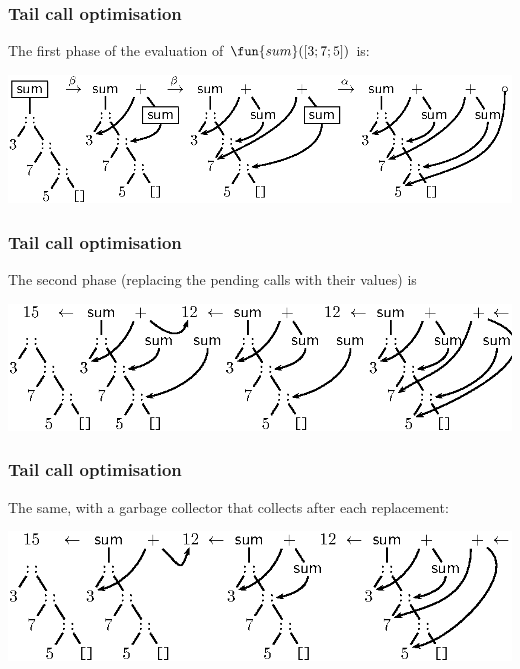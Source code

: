 \documentclass[compress,dvips,xcolor={dvipsnames},t]{beamer}
\begin{document}
\begin{frame}
  \frametitle{Tail call optimisation}

  The first phase of the evaluation of \(\fun{sum}([3;7;5])\) is:
  \begin{center}
    \includegraphics[bb=148 582 460 665]{sum375_push}
  \end{center}

\end{frame}

\begin{frame}
  \frametitle{Tail call optimisation}

  The second phase (replacing the pending calls with their values) is
  \begin{center}
    \includegraphics[bb=148 582 460 665]{sum375_pop}
  \end{center}

\end{frame}

\begin{frame}
  \frametitle{Tail call optimisation}

  The same, with a garbage collector that collects after each
  replacement:
  \begin{center}
    \includegraphics[bb=148 582 460 665]{sum375_pop1}
  \end{center}

\end{frame}
\end{document}
